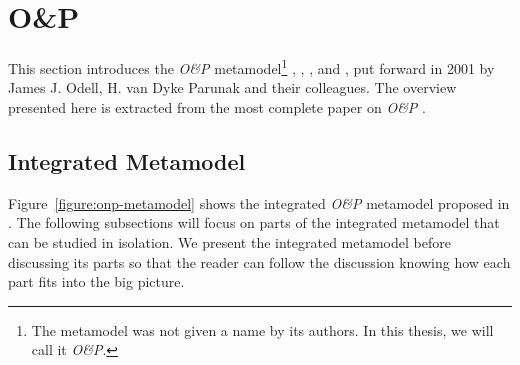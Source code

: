 
\section{O\&P}

This section introduces the \textit{O\&P} metamodel\footnote{The metamodel was not given a name by its authors. In this thesis, we will call it \textit{O\&P}.} \cite{Odell01}, \cite{Parunak02}, \cite{Odell03b}, \cite{Odell04b} and \cite{Odell05}, put forward in 2001 by James J. Odell, H. van Dyke Parunak and their colleagues.
The overview presented here is extracted from the most complete paper on \textit{O\&P} \cite{Odell05}.


\subsection{Integrated Metamodel}

Figure~\ref{figure:onp-metamodel} shows the integrated \textit{O\&P} metamodel proposed in \cite{Odell05}.
The following subsections will focus on parts of the integrated metamodel that can be studied in isolation.
We present the integrated metamodel before discussing its parts so that the reader can follow the discussion knowing how each part fits into the big picture.

